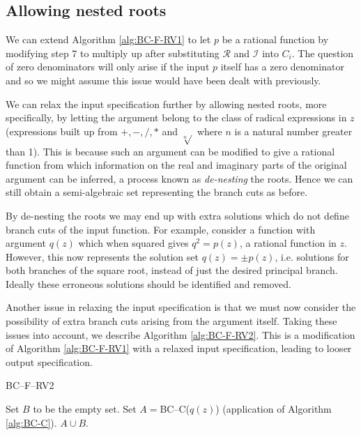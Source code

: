 \documentclass{llncs}
\begin{document}
\subsection{Allowing nested roots}

We can extend Algorithm \ref{alg:BC-F-RV1} to let $p$ be a rational function by modifying step 7 to multiply up after substituting $\mathcal{R}$ and $\mathcal{I}$ into $C_i$.  The question of zero denominators will only arise if the input $p$ itself has a zero denominator and so we might assume this issue would have been dealt with previously.

We can relax the input specification further by allowing nested roots, more specifically, by letting the argument belong to the class of radical expressions in $z$ (expressions built up from $+,-,/,*$ and $\sqrt[n]{}$ where $n$ is a natural number greater than 1).  This is because such an argument can be modified to give a rational function from which information on the real and imaginary parts of the original argument can be inferred, a process known as \textit{de-nesting} the roots.  Hence we can still obtain a semi-algebraic set representing the branch cuts as before.  

By de-nesting the roots we may end up with extra solutions which do not define branch cuts of the input function.  For example, consider a function with argument $q(z)$ which when squared gives $q^2=p(z)$, a rational function in $z$.  However, this now represents the solution set $q(z) = \pm p(z)$, i.e. solutions for both branches of the square root, instead of just the desired principal branch.  Ideally these erroneous solutions should be identified and removed.

Another issue in relaxing the input specification is that we must now consider the possibility of extra branch cuts arising from the argument itself.  Taking these issues into account, we describe Algorithm \ref{alg:BC-F-RV2}.  This is a modification of Algorithm \ref{alg:BC-F-RV1} with a relaxed input specification, leading to looser output specification.  

\begin{algorithm}[ht] \caption{BC--F--RV2} \label{alg:BC-F-RV2}
\DontPrintSemicolon
{}
\BlankLine
{}
{Set $B$ to be the empty set. \;}
Set $A = $BC--C($q(z)$) (application of Algorithm \ref{alg:BC-C}). \;
\Return $A \cup B$.
\end{algorithm}
\end{document}
